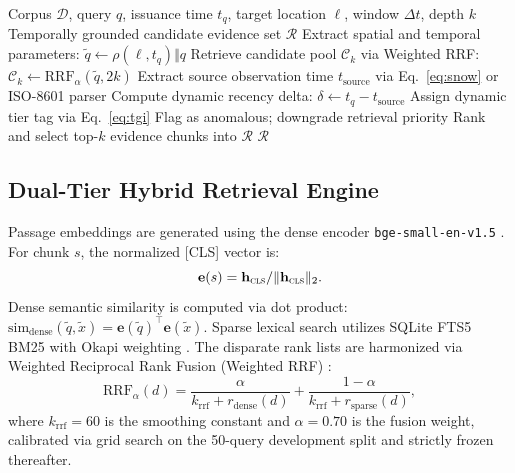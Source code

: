 \documentclass[conference]{IEEEtran}
\begin{document}
\begin{algorithm}[ht]\footnotesize
\caption{Dynamic Temporal Evidence Tagging and Retrieval}
\label{alg:tgi}
\begin{algorithmic}[1]
\REQUIRE Corpus $\mathcal{D}$, query $q$, issuance time $t_q$, target location $\ell$, window $\Delta t$, depth $k$
\ENSURE Temporally grounded candidate evidence set $\mathcal{R}$
\STATE Extract spatial and temporal parameters: $\tilde{q} \leftarrow \rho(\ell, t_q) \Vert q$
\STATE Retrieve candidate pool $\mathcal{C}_k$ via Weighted RRF: $\mathcal{C}_k \leftarrow \mathrm{RRF}_\alpha(\tilde{q}, 2k)$
  \STATE Extract source observation time $t_{\mathrm{source}}$ via Eq.~\eqref{eq:snow} or ISO-8601 parser
  \STATE Compute dynamic recency delta: $\delta \leftarrow t_q - t_{\mathrm{source}}$
  \STATE Assign dynamic tier tag via Eq.~\eqref{eq:tgi}
    \STATE Flag as anomalous; downgrade retrieval priority
  \ENDIF
\ENDFOR
\STATE Rank and select top-$k$ evidence chunks into $\mathcal{R}$
\RETURN $\mathcal{R}$
\end{algorithmic}
\end{algorithm}

\subsection{Dual-Tier Hybrid Retrieval Engine}
Passage embeddings are generated using the dense encoder \texttt{bge-small-en-v1.5} \cite{bge}. For chunk $s$, the normalized [CLS] vector is:
\begin{equation}
\mathbf{e}(s) = \mathbf{h}_{\textsc{cls}} / \lVert\mathbf{h}_{\textsc{cls}}\rVert_2.
\label{eq:emb}
\end{equation}
Dense semantic similarity is computed via dot product: $\mathrm{sim}_{\mathrm{dense}}(\tilde{q}, \tilde{x}) = \mathbf{e}(\tilde{q})^\top \mathbf{e}(\tilde{x})$. Sparse lexical search utilizes SQLite FTS5 BM25 with Okapi weighting \cite{bm25}. The disparate rank lists are harmonized via Weighted Reciprocal Rank Fusion (Weighted RRF) \cite{rrf}:
\begin{equation}
\mathrm{RRF}_{\alpha}(d) = \frac{\alpha}{k_{\mathrm{rrf}} + r_{\mathrm{dense}}(d)} + \frac{1 - \alpha}{k_{\mathrm{rrf}} + r_{\mathrm{sparse}}(d)},
\label{eq:rrf}
\end{equation}
where $k_{\mathrm{rrf}} = 60$ is the smoothing constant and $\alpha = 0.70$ is the fusion weight, calibrated via grid search on the 50-query development split and strictly frozen thereafter.
\end{document}
